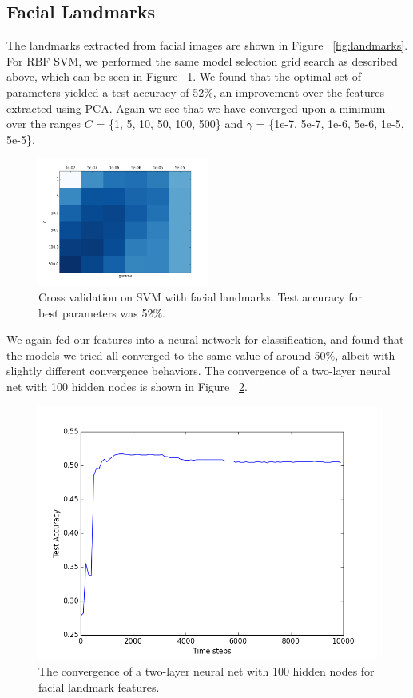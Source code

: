 \documentclass[10pt, twocolumn, twoside]{article}
\begin{document}
\subsection{Facial Landmarks}

The landmarks extracted from facial images are shown in Figure ~\ref{fig:landmarks}.
For RBF SVM, we performed the same model selection grid search as described above,
which can be seen in Figure ~\ref{fig:grid_landmarks}.
We found that the optimal set of parameters yielded a test accuracy of 52\%, an
improvement over the features extracted using PCA. Again we see that we have
converged upon a minimum over the ranges $C$ = \{1, 5, 10, 50, 100, 500\} and
$\gamma$ = \{1e-7, 5e-7, 1e-6, 5e-6, 1e-5, 5e-5\}.

\begin{figure}[htb]
\centering
\includegraphics[width=0.5\textwidth]{grid_search_landmarks}
\caption{\label{fig:grid_landmarks} Cross validation on SVM with facial landmarks.
Test accuracy for best parameters was 52\%.}
\end{figure}

We again fed our features into a neural network for classification, and found that
the models we tried all converged to the same value of around 50\%, albeit with
slightly different convergence behaviors. The convergence of a two-layer neural net
with 100 hidden nodes is shown in Figure ~\ref{fig:landmarks_nnet}.

\begin{figure}[htb]
\centering
\includegraphics[width=\linewidth]{landmarks_nn_accuracy}
\caption{\label{fig:landmarks_nnet} The convergence of a two-layer neural net with 100
hidden nodes for facial landmark features.}
\end{figure}
\end{document}

